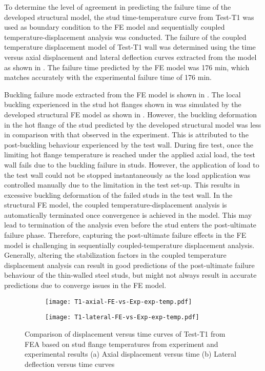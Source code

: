 To determine the level of agreement in predicting the failure time of the developed structural model, the stud time-temperature curve from Test-T1 was used as boundary condition to the FE model and sequentially coupled temperature-displacement analysis was conducted. The failure of the coupled temperature displacement model of Test-T1 wall was determined using the time versus axial displacement and lateral deflection curves extracted from the model as shown in . The failure time predicted by the FE model was 176 min, which matches accurately with the experimental failure time of 176 min. 

Buckling failure mode extracted from the FE model is shown in . The local buckling experienced in the stud hot flanges shown in  was simulated by the developed structural FE model as shown in . However, the buckling deformation in the hot flange of the stud predicted by the developed structural model was less in comparison with that observed in the experiment. This is attributed to the post-buckling behaviour experienced by the test wall. During fire test, once the limiting hot flange temperature is reached under the applied axial load, the test wall fails due to the buckling failure in studs. However, the application of load to the test wall could not be stopped instantaneously as the load application was controlled manually due to the limitation in the test set-up. This results in excessive buckling deformation of the failed studs in the test wall. In the structural FE model, the coupled temperature-displacement analysis is automatically terminated once convergence is achieved in the model. This may lead to termination of the analysis even before the stud enters the post-ultimate failure phase. Therefore, capturing the post-ultimate failure effects in the FE model is challenging in sequentially coupled-temperature displacement analysis. Generally, altering the stabilization factors in the coupled temperature displacement analysis can result in good predictions of the post-ultimate failure behaviour of the thin-walled steel studs, but might not always result in accurate predictions due to converge issues in the FE model.
\begin{figure}[!htbp]
	\centering
	\begin{subfigure}[b]{0.7\textwidth}
		\centering
		\texttt{[image: T1-axial-FE-vs-Exp-exp-temp.pdf]}
		\caption{}
		\label{subfig:T1-axial-FE-vs-Exp-exp-temp}
	\end{subfigure}
	\begin{subfigure}[b]{0.7\textwidth}
		\centering
		\texttt{[image: T1-lateral-FE-vs-Exp-exp-temp.pdf]}
		\caption{}
		\label{subfig:T1-lateral-FE-vs-Exp-exp-temp}
	\end{subfigure}
	   \caption{Comparison of displacement versus time curves of Test-T1 from FEA based on stud flange temperatures from experiment and experimental results (a) Axial displacement versus time (b) Lateral deflection versus time curves}
	   \label{fig:T1-structural-FE-vs-Exp-exp-temp}
\end{figure} 
